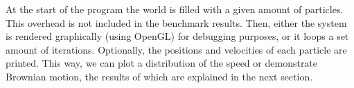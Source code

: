 At the start of the program the world is filled with a given amount of 
particles. This overhead is not included in the benchmark results. Then, 
either the system is rendered graphically (using OpenGL) for debugging 
purposes, or it loops a set amount of iterations.  Optionally, the 
positions and velocities of each particle are printed. This way, we can 
plot a distribution of the speed or demonstrate Brownian motion, the 
results of which are explained in the next section.
